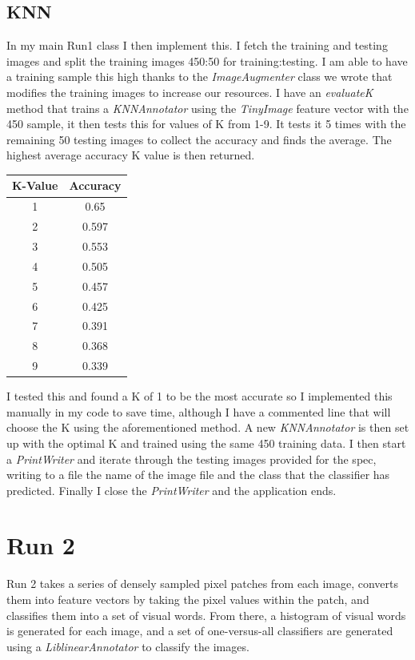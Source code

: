 \documentclass{article}
\begin{document}
	\subsection{KNN}
	In my main Run1 class I then implement this. I fetch the training and testing images and split the training images 450:50 for training:testing. I am able to have a training sample this high thanks to the \textit{ImageAugmenter} class we wrote that modifies the training images to increase our resources.
	I have an \textit{evaluateK} method that trains a \textit{KNNAnnotator} using the \textit{TinyImage} feature vector with the 450 sample, it then tests this for values of K from 1-9. It tests it 5 times with the remaining 50 testing images to collect the accuracy and finds the average. The highest average accuracy K value is then returned.\\
	\centering
	\begin{tabular}{|c|c|}
		\hline
		K-Value & Accuracy\\ \hline \hline
		1 & 0.65\\
		2 & 0.597\\
		3 & 0.553\\
		4 & 0.505\\
		5 & 0.457\\
		6 & 0.425\\
		7 & 0.391\\
		8 & 0.368\\
		9 & 0.339\\ \hline
	\end{tabular}
	\flushleft
	I tested this and found a K of 1 to be the most accurate so I implemented this manually in my code to save time, although I have a commented line that will choose the K using the aforementioned method.
	A new \textit{KNNAnnotator} is then set up with the optimal K and trained using the same 450 training data. I then start a \textit{PrintWriter} and iterate through the testing images provided for the spec, writing to a file the name of the image file and the class that the classifier has predicted.
	Finally I close the \textit{PrintWriter} and the application ends.
	\section{Run 2}
	
	Run 2 takes a series of densely sampled pixel patches from each image, converts them into feature vectors by taking the pixel values within the patch, and classifies them into a set of visual words. From there, a histogram of visual words is generated for each image, and a set of one-versus-all classifiers are generated using a \textit{LiblinearAnnotator} to classify the images. 
	
\end{document}
